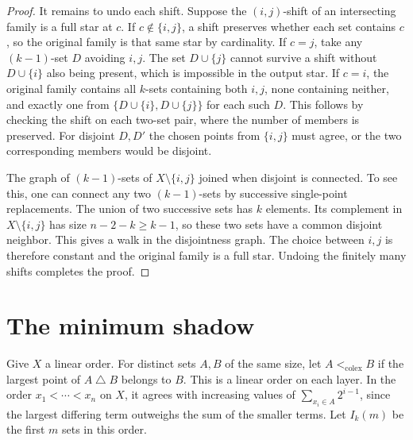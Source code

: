 \documentclass[11pt,oneside,openany]{book}
\theoremstyle{plain}
\theoremstyle{definition}
\theoremstyle{remark}
\begin{document}
\begin{proof}
It remains to undo each shift. Suppose the \((i,j)\)-shift of an
intersecting family is a full star at \(c\). If \(c\notin\{i,j\}\),
a shift preserves whether each set contains \(c\), so the original
family is that same star by cardinality. If \(c=j\), take any
\((k-1)\)-set \(D\) avoiding \(i,j\). The set \(D\cup\{j\}\)
cannot survive a shift without \(D\cup\{i\}\) also being present,
which is impossible in the output star. If \(c=i\), the original
family contains all \(k\)-sets containing both \(i,j\), none
containing neither, and exactly one from
\(\{D\cup\{i\},D\cup\{j\}\}\) for each such \(D\). This follows by
checking the shift on each two-set pair, where the number of
members is preserved. For disjoint \(D,D'\) the chosen points
from \(\{i,j\}\) must agree, or the two corresponding members
would be disjoint.

The graph of \((k-1)\)-sets of \(X\setminus\{i,j\}\) joined when
disjoint is connected. To see this, one can connect any two
\((k-1)\)-sets by successive single-point replacements. The union
of two successive sets has \(k\) elements. Its complement in
\(X\setminus\{i,j\}\) has size \(n-2-k\ge k-1\), so these two
sets have a common disjoint neighbor. This gives a walk in the
disjointness graph. The choice between \(i,j\) is therefore
constant and the original family is a full star. Undoing the
finitely many shifts completes the proof.
\end{proof}

\section{The minimum shadow}

Give \(X\) a linear order. For distinct sets \(A,B\) of the same
size, let \(A<_{\mathrm{colex}}B\) if the largest point of
\(A\mathbin{\triangle} B\) belongs to \(B\). This is a linear order
on each layer. In the order \(x_1<\cdots<x_n\) on \(X\), it agrees
with increasing values of \(\sum_{x_i\in A}2^{i-1}\), since the
largest differing term outweighs the sum of the smaller terms.
Let \(I_k(m)\) be the first \(m\) sets in this order.
\end{document}
